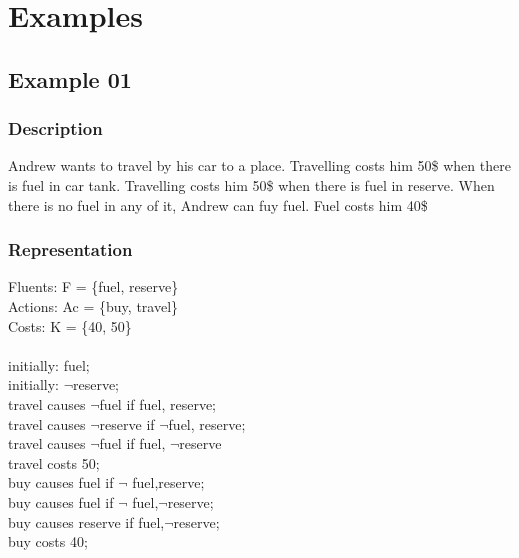\documentclass[11pt]{article}
\begin{document}
	\section{Examples}\label{sec:Examples}
	\subsection{Example 01}\label{example:ex01}
	\subsubsection{Description}\label{par:p101}
	Andrew wants to travel by his car to a place. Travelling costs him 50\$ when there is fuel in car tank. Travelling costs him 50\$ when there is fuel in reserve. When there is no fuel in any of it, Andrew can fuy fuel. Fuel costs him 40\$
	\subsubsection{Representation}\label{par:p201}
	Fluents: F = \{fuel, reserve\}\\
	Actions: Ac = \{buy, travel\}\\
	Costs: K = \{40, 50\}\\
	\\
	initially:  fuel; \\
	initially: $\neg$reserve; \\
	travel causes $\neg$fuel if fuel, reserve; \\
	travel causes $\neg$reserve if $\neg$fuel, reserve;\\
	travel causes $\neg$fuel if fuel, $\neg$reserve\\
	travel costs 50; \\
	buy causes fuel if $\neg$ fuel,reserve;\\
	buy causes fuel if $\neg$ fuel,$\neg$reserve;\\
	buy causes reserve if  fuel,$\neg$reserve;\\
	buy costs 40; \\
\end{document}
